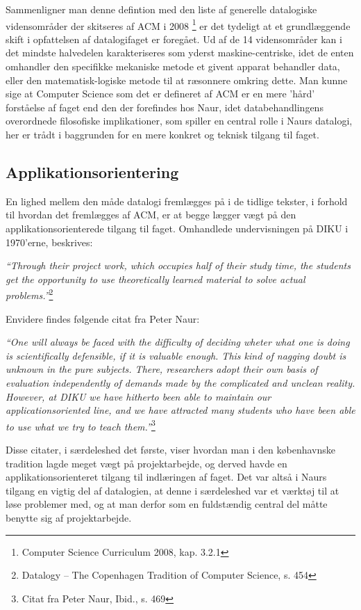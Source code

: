 \documentclass[10pt,a4paper]{article}
\newcommand{\citat}[2]{\begin{justify}\textit{``#1''}\hspace{0.1cm}\footnote{#2}\end{justify}}
\begin{document}
Sammenligner man denne defintion med den liste af generelle datalogiske vidensområder
der skitseres af ACM i 2008 \footnote{Computer Science Curriculum 2008, kap. 3.2.1} er det 
tydeligt at et grundlæggende skift i opfattelsen af datalogifaget er foregået. Ud af
de 14 vidensområder kan i det mindste halvedelen karakteriseres som yderst 
maskine-centriske, idet de enten omhandler den specifikke mekaniske 
metode et givent apparat behandler data, eller den matematisk-logiske 
metode til at ræsonnere omkring dette. Man kunne sige at Computer Science
som det er defineret af ACM er en mere 'hård' forståelse af faget end den 
der forefindes hos Naur, idet databehandlingens overordnede filosofiske 
implikationer, som spiller en central rolle i Naurs datalogi, her er 
trådt i baggrunden for en mere konkret og teknisk tilgang til faget. 

\subsection{Applikationsorientering}
En lighed mellem den måde datalogi fremlægges på i de tidlige tekster, i forhold
til hvordan det fremlægges af ACM, er at begge lægger vægt på den
applikationsorienterede tilgang til faget. Omhandlede undervisningen på DIKU i 
1970'erne, beskrives:
\citat{Through their project work, which occupies half of their study time, the
    students get the opportunity to use theoretically learned material to solve
    actual problems.}{Datalogy -- The Copenhagen Tradition of Computer
    Science, s. 454}

Envidere findes følgende citat fra Peter Naur: \citat{One will always be faced
    with the difficulty of deciding wheter what one is doing is scientifically
    defensible, if it is valuable enough. This kind of nagging doubt is unknown
    in the pure subjects. There, researchers adopt their own basis of evaluation
    independently of demands made by the complicated and unclean reality.
    However, at DIKU we have hitherto been able to maintain our
    applicationsoriented line, and we have attracted many students who have been
    able to use what we try to teach them.}{Citat fra Peter Naur, Ibid., s. 469}

Disse citater, i særdeleshed det første, viser hvordan man i den københavnske
tradition lagde meget vægt på projektarbejde, og derved havde en
applikationsorienteret tilgang til indlæringen af faget. Det var altså i Naurs
tilgang en vigtig del af datalogien, at denne i særdeleshed var et værktøj til
at løse problemer med, og at man derfor som en fuldstændig central del måtte
benytte sig af projektarbejde.
\end{document}
